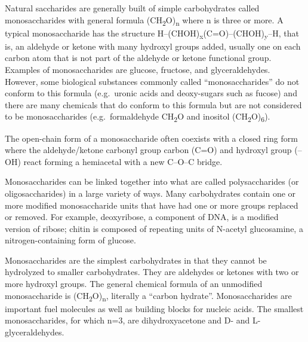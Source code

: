 Natural saccharides are generally built of simple carbohydrates called monosaccharides with general formula (CH\textsubscript{2}O)\textsubscript{n} where n is three or more. A typical monosaccharide has the structure H--(CHOH)\textsubscript{x}(C=O)--(CHOH)\textsubscript{y}--H, that is, an aldehyde or ketone with many hydroxyl groups added, usually one on each carbon atom that is not part of the aldehyde or ketone functional group. Examples of monosaccharides are glucose, fructose, and glyceraldehydes. However, some biological substances commonly called ``monosaccharides'' do not conform to this formula (e.g.~uronic acids and deoxy-sugars such as fucose) and there are many chemicals that do conform to this formula but are not considered to be monosaccharides (e.g.~formaldehyde CH\textsubscript{2}O and inositol (CH\textsubscript{2}O)\textsubscript{6}).

The open-chain form of a monosaccharide often coexists with a closed ring form where the aldehyde/ketone carbonyl group carbon (C=O) and hydroxyl group (--OH) react forming a hemiacetal with a new C--O--C bridge.

Monosaccharides can be linked together into what are called polysaccharides (or oligosaccharides) in a large variety of ways. Many carbohydrates contain one or more modified monosaccharide units that have had one or more groups replaced or removed. For example, deoxyribose, a component of DNA, is a modified version of ribose; chitin is composed of repeating units of N-acetyl glucosamine, a nitrogen-containing form of glucose.

Monosaccharides are the simplest carbohydrates in that they cannot be hydrolyzed to smaller carbohydrates. They are aldehydes or ketones with two or more hydroxyl groups. The general chemical formula of an unmodified monosaccharide is (CH\textsubscript{2}O)\textsubscript{n}, literally a ``carbon hydrate''. Monosaccharides are important fuel molecules as well as building blocks for nucleic acids. The smallest monosaccharides, for which n=3, are dihydroxyacetone and D- and L-glyceraldehydes.

